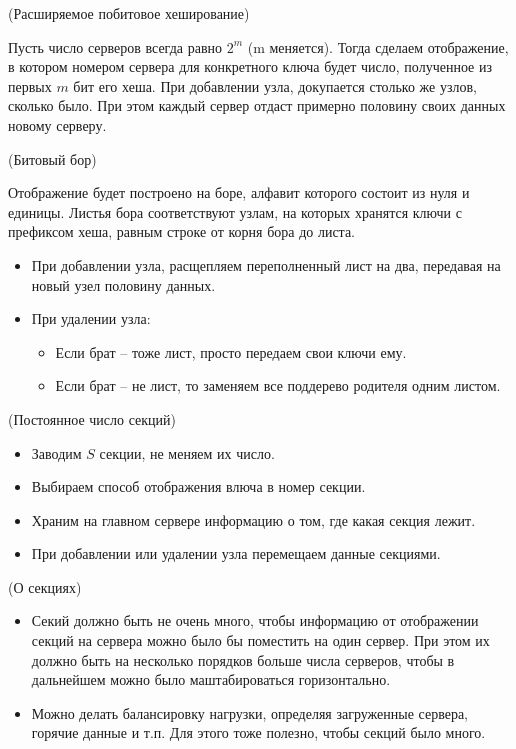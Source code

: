 \begin{algorithm}(Расширяемое побитовое хеширование)
    
    Пусть число серверов всегда равно $2^m$ (m меняется). Тогда
    сделаем отображение, в котором номером сервера для конкретного ключа
    будет число, полученное из первых $m$ бит его хеша. При добавлении узла,
    докупается столько же узлов, сколько было. При этом каждый сервер отдаст
    примерно половину своих данных новому серверу.
\end{algorithm}

\begin{algorithm}(Битовый бор)
    
    Отображение будет построено на боре, алфавит которого состоит из нуля и
    единицы. Листья бора соответствуют узлам, на которых хранятся ключи с 
    префиксом хеша, равным строке от корня бора до листа.
    \begin{itemize}
        \item При добавлении узла, расщепляем переполненный лист на два,
            передавая на новый узел половину данных.
        \item При удалении узла:
            \begin{itemize}
                \item Если брат -- тоже лист, просто передаем свои ключи ему.
                \item Если брат -- не лист, то заменяем все поддерево родителя
                    одним листом.
            \end{itemize}
    \end{itemize}
\end{algorithm}

\begin{algorithm}(Постоянное число секций)
    
    \begin{itemize}
        \item Заводим $S$ секции, не меняем их число.
        \item Выбираем способ отображения влюча в номер секции.
        \item Храним на главном сервере информацию о том, где какая секция лежит.
        \item При добавлении или удалении узла перемещаем данные секциями.
    \end{itemize}
\end{algorithm}

\begin{remark}(О секциях)
    \enewline
    \begin{itemize}
        \item Секий должно быть не очень много, чтобы информацию от отображении
            секций на сервера можно было бы поместить на один сервер. При этом
            их должно быть на несколько порядков больше числа серверов,
            чтобы в дальнейшем можно было маштабироваться горизонтально.
        \item Можно делать балансировку нагрузки, определяя загруженные сервера,
            горячие данные и т.п. Для этого тоже полезно, чтобы секций было много.
    \end{itemize}
\end{remark}

